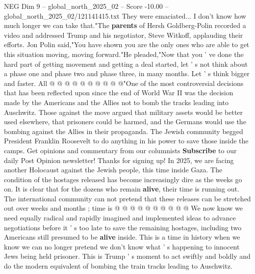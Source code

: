 \begin{textsample}{NEG Dim 9 – global\_north\_2025\_02 – Score -10.00 – global\_north\_2025\_02/121141415.txt}
They were emaciated...
I don't know how much longer we can take that."The \textbf{parents} of Hersh Goldberg-Polin recorded a video and addressed Trump and his negotiator, Steve Witkoff, applauding their efforts.
Jon Polin said,"You have shown you are the only ones who are able to get this situation moving, moving forward."He pleaded,"Now that you ' ve done the hard part of getting movement and getting a deal started, let ' s not think about a phase one and phase two and phase three, in many months.
Let ' s think bigger and faster.
All @ @ @ @ @ @ @ @ @ @"One of the most controversial decisions that has been reflected upon since the end of World War II was the decision made by the Americans and the Allies not to bomb the tracks leading into Auschwitz.
Those against the move argued that military assets would be better used elsewhere, that prisoners could be harmed, and the Germans would use the bombing against the Allies in their propaganda.
The Jewish community begged President Franklin Roosevelt to do anything in his power to save those inside the camps.
Get opinions and commentary from our columnists \textbf{Subscribe} to our daily Post Opinion newsletter!
Thanks for signing up!
In 2025, we are facing another Holocaust against the Jewish people, this time inside Gaza.
The condition of the hostages released has become increasingly dire as the weeks go on.
It is clear that for the dozens who remain \textbf{alive}, their time is running out.
The international community can not pretend that these releases can be stretched out over weeks and months ; time is @ @ @ @ @ @ @ @ @ @ We now know we need equally radical and rapidly imagined and implemented ideas to advance negotiations before it ' s too late to save the remaining hostages, including two Americans still presumed to be \textbf{alive} inside.
This is a time in history when we know we can no longer pretend we don't know what ' s happening to innocent Jews being held prisoner.
This is Trump ' s moment to act swiftly and boldly and do the modern equivalent of bombing the train tracks leading to Auschwitz.

\end{textsample}
